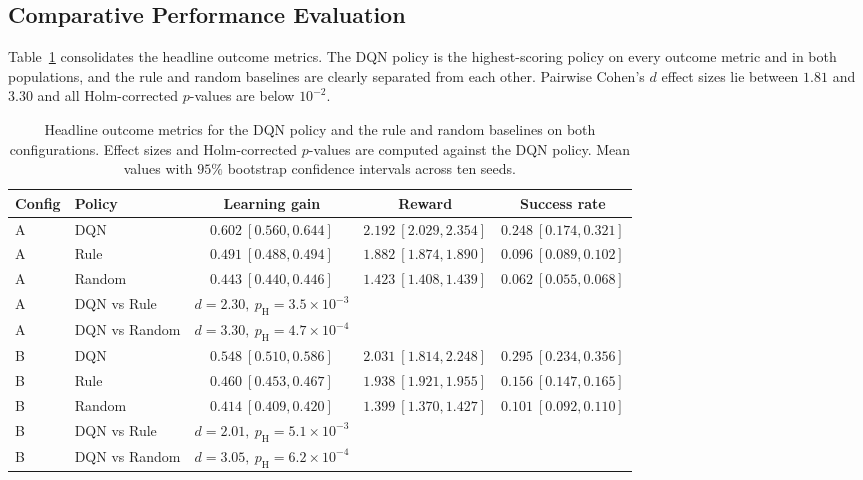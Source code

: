 \subsection{Comparative Performance Evaluation}\label{sec:results_adapt_comparison}

Table~\ref{tab:rl_main_results} consolidates the headline
outcome metrics. The \ac{DQN} policy is the highest-scoring policy
on every outcome metric and in both populations, and the rule
and random baselines are clearly separated from each other.
Pairwise Cohen's $d$ effect sizes lie between $1.81$ and $3.30$
and all Holm-corrected $p$-values are below $10^{-2}$.

\begin{table}[H]
\centering
\caption{Headline outcome metrics for the \ac{DQN} policy and the
rule and random baselines on both configurations. Effect sizes
and Holm-corrected $p$-values are computed against the \ac{DQN}
policy. Mean values with $95\%$ bootstrap confidence intervals
across ten seeds.}
\label{tab:rl_main_results}
\footnotesize
\setlength{\tabcolsep}{4pt}
\begin{tabular}{llccc}
\toprule
\textbf{Config} & \textbf{Policy} & \textbf{Learning gain} & \textbf{Reward} & \textbf{Success rate} \\
\midrule
A & \ac{DQN}     & $0.602\ [0.560,0.644]$ & $2.192\ [2.029,2.354]$ & $0.248\ [0.174,0.321]$ \\
A & Rule    & $0.491\ [0.488,0.494]$ & $1.882\ [1.874,1.890]$ & $0.096\ [0.089,0.102]$ \\
A & Random  & $0.443\ [0.440,0.446]$ & $1.423\ [1.408,1.439]$ & $0.062\ [0.055,0.068]$ \\
\midrule
A & \ac{DQN} vs Rule    & $d=2.30,\ p_{\text{H}}{=}3.5{\times}10^{-3}$ & & \\
A & \ac{DQN} vs Random  & $d=3.30,\ p_{\text{H}}{=}4.7{\times}10^{-4}$ & & \\
\midrule
B & \ac{DQN}     & $0.548\ [0.510,0.586]$ & $2.031\ [1.814,2.248]$ & $0.295\ [0.234,0.356]$ \\
B & Rule    & $0.460\ [0.453,0.467]$ & $1.938\ [1.921,1.955]$ & $0.156\ [0.147,0.165]$ \\
B & Random  & $0.414\ [0.409,0.420]$ & $1.399\ [1.370,1.427]$ & $0.101\ [0.092,0.110]$ \\
\midrule
B & \ac{DQN} vs Rule    & $d=2.01,\ p_{\text{H}}{=}5.1{\times}10^{-3}$ & & \\
B & \ac{DQN} vs Random  & $d=3.05,\ p_{\text{H}}{=}6.2{\times}10^{-4}$ & & \\
\bottomrule
\end{tabular}
\end{table}

